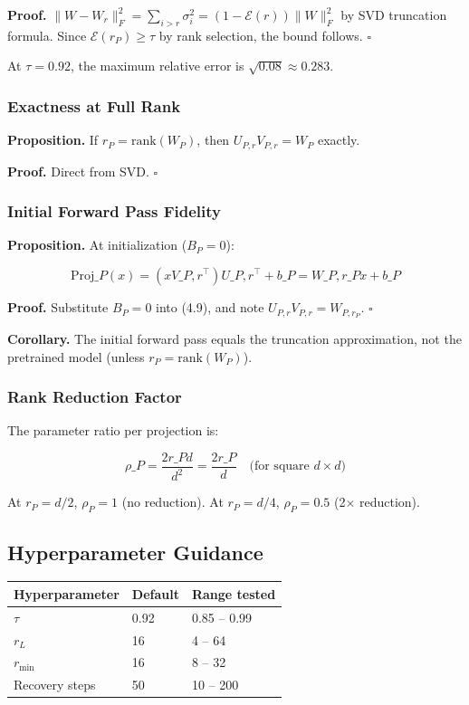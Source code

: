 \textbf{Proof.} $\|W - W_r\|_F^2 = \sum_{i > r} \sigma_i^2 = (1 - \mathcal{E}(r)) \|W\|_F^2$ by 
SVD truncation formula. Since $\mathcal{E}(r_P) \geq \tau$ by rank selection, 
the bound follows. $\square$

At $\tau = 0.92$, the maximum relative error is $\sqrt{0.08} \approx 0.283$.

\subsubsection{Exactness at Full Rank}

\textbf{Proposition.} If $r_P = \mathrm{rank}(W_P)$, then $U_{P, r} V_{P, r} = W_P$ exactly.

\textbf{Proof.} Direct from SVD. $\square$

\subsubsection{Initial Forward Pass Fidelity}

\textbf{Proposition.} At initialization ($B_P = 0$):

\[
\text{Proj}\_P(x) = (x V\_{P, r}^\top) U\_{P, r}^\top + b\_P = W\_{P, r\_P} x + b\_P
\tag{4.12}
\]

\textbf{Proof.} Substitute $B_P = 0$ into (4.9), and note $U_{P, r} V_{P, r} = W_{P, r_P}$. 
$\square$

\textbf{Corollary.} The initial forward pass equals the truncation approximation, 
not the pretrained model (unless $r_P = \text{rank}(W_P)$).

\subsubsection{Rank Reduction Factor}

The parameter ratio per projection is:

\[
\rho\_P = \frac{2 r\_P d}{d^2} = \frac{2 r\_P}{d} \quad \text{(for square } d \times d\text{)}
\tag{4.13}
\]

At $r_P = d/2$, $\rho_P = 1$ (no reduction). At $r_P = d/4$, $\rho_P = 0.5$ (2$\times$ reduction).

\subsection{Hyperparameter Guidance}

\begin{table}[H]
\centering
\small
\begin{tabular}{lll}
\toprule
\textbf{Hyperparameter} & \textbf{Default} & \textbf{Range tested} \\
\midrule
$\tau$ & 0.92 & 0.85 -- 0.99 \\
$r_L$ & 16 & 4 -- 64 \\
$r_\text{min}$ & 16 & 8 -- 32 \\
Recovery steps & 50 & 10 -- 200 \\
\bottomrule
\end{tabular}
\end{table}

